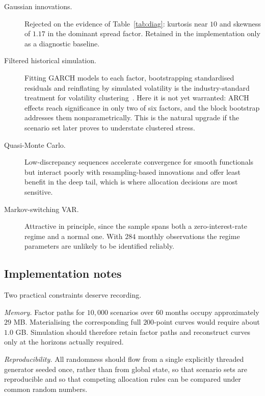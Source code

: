 \documentclass[11pt,a4paper]{article}
\begin{document}
\begin{description}
  \item[Gaussian innovations.] Rejected on the evidence of
    Table~\ref{tab:diag}: kurtosis near $10$ and skewness of $1.17$ in the
    dominant spread factor. Retained in the implementation only as a diagnostic
    baseline.

  \item[Filtered historical simulation.] Fitting GARCH models to each factor,
    bootstrapping standardised residuals and reinflating by simulated volatility
    is the industry-standard treatment for volatility
    clustering~\cite{fhs}. Here it is not yet warranted: ARCH effects reach
    significance in only two of six factors, and the block bootstrap addresses
    them nonparametrically. This is the natural upgrade if the scenario set
    later proves to understate clustered stress.

  \item[Quasi-Monte Carlo.] Low-discrepancy sequences accelerate convergence for
    smooth functionals but interact poorly with resampling-based innovations and
    offer least benefit in the deep tail, which is where allocation decisions
    are most sensitive.

  \item[Markov-switching VAR.] Attractive in principle, since the sample spans
    both a zero-interest-rate regime and a normal one. With $284$ monthly
    observations the regime parameters are unlikely to be identified reliably.
\end{description}

\subsection{Implementation notes}

Two practical constraints deserve recording.

\emph{Memory.} Factor paths for $10{,}000$ scenarios over $60$ months occupy
approximately $29$ MB. Materialising the corresponding full $200$-point curves
would require about $1.0$ GB. Simulation should therefore retain factor paths and
reconstruct curves only at the horizons actually required.

\emph{Reproducibility.} All randomness should flow from a single explicitly
threaded generator seeded once, rather than from global state, so that scenario
sets are reproducible and so that competing allocation rules can be compared
under common random numbers.
\end{document}

